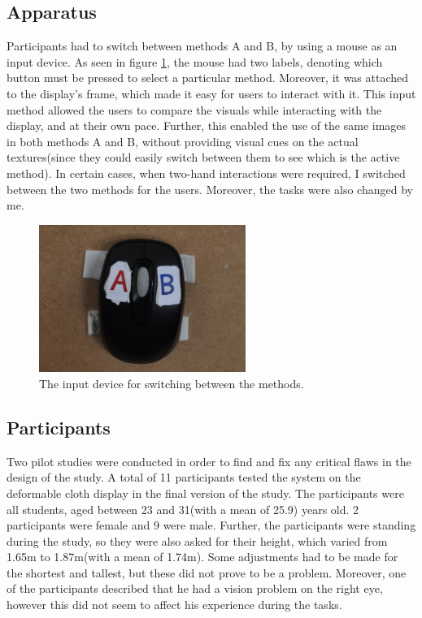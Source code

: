 \documentclass[]{article}
\begin{document}
\subsection{Apparatus}

Participants had to switch between methods A and B, by using a mouse as an input device. As seen in figure \ref{fig:Mouse}, the mouse had two labels, denoting which button must be pressed to select a particular method. Moreover, it was attached to the display's frame, which made it easy for users to interact with it. This input method allowed the users to compare the visuals while interacting with the display, and at their own pace. Further, this enabled the use of the same images in both methods A and B, without providing visual cues on the actual textures(since they could easily switch between them to see which is the active method).  In certain cases, when two-hand interactions were required, I switched between the two methods for the users. Moreover, the tasks were also changed by me. 

\begin{figure}[!hbtp]
    \centering
    \includegraphics[width=0.6\textwidth]{figures/UserStudyMouseInput.JPG}
    \caption{The input device for switching between the methods.}
    \label{fig:Mouse}
\end{figure}

\subsection{Participants}

Two pilot studies were conducted in order to find and fix any critical flaws in the design of the study. A total of 11 participants tested the system on the deformable cloth display in the final version of the study. The participants were all students, aged between 23 and 31(with a mean of 25.9) years old. 2 participants were female and 9 were male. Further, the participants were standing during the study, so they were also asked for their height, which varied from 1.65m to 1.87m(with a mean of 1.74m). Some adjustments had to be made for the shortest and tallest, but these did not prove to be a problem. Moreover, one of the participants described that he had a vision problem on the right eye, however this did not seem to affect his experience during the tasks.
\end{document}
